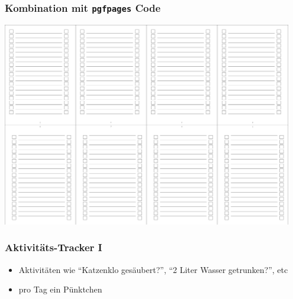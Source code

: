 \documentclass[12pt,ngerman]{beamer}
\begin{document}
\begin{frame}[containsverbatim]
\frametitle{Kombination mit \texttt{pgfpages} Code}

\begin{center}
\includegraphics[width=0.95\textwidth]{PocketMod_for_A3}
\end{center}

\end{frame}

\begin{frame}[containsverbatim]
\frametitle{Aktivitäts-Tracker I}

\begin{itemize}
	\item Aktivitäten wie \enquote{Katzenklo gesäubert?}, \enquote{2 Liter Wasser getrunken?}, etc
	\item pro Tag ein Pünktchen
\end{itemize}

\scalebox{1.1}{%
}\vspace*{1em}

\end{frame}
\end{document}
